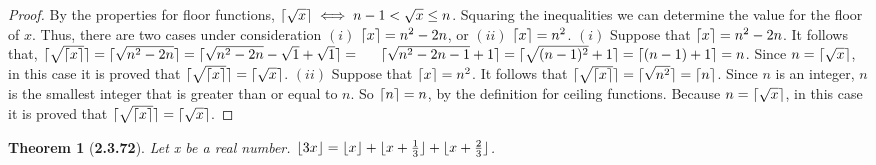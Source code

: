 \documentclass[a4paper, 12pt]{article}
\theoremstyle{plain}
\newtheorem*{theorem*}{Theorem}
\DeclarePairedDelimiter{\floor}{\lfloor}{\rfloor}
\DeclarePairedDelimiter{\ceil}{\lceil}{\rceil}
\begin{document}
\begin{proof}
    By the properties for floor functions, \newline $\ceil{\sqrt{x}} \iff n-1 < \sqrt{x} \le n$. 
    Squaring the inequalities we can determine the value for the floor of $x$. Thus, there are 
    two cases under consideration $(i)$ $\ceil{x} = n^{2} - 2n$, or $(ii)$ $\ceil{x} = n^{2}$.
    \newline
    \newline
    \indent $(i)$ Suppose that $\ceil{x} = n^{2} - 2n$. It follows that, \newline \indent 
    $\ceil{\sqrt{\ceil{x}}} = \ceil{\sqrt{n^{2} - 2n}} = 
    \ceil{\sqrt{n^{2} - 2n} - \sqrt{1} + \sqrt{1}} = \newline \indent 
    \ceil{\sqrt{n^{2} - 2n - 1} + 1} = \ceil{\sqrt{(n-1)^{2}} + 1} = \ceil{(n-1)+1} = n$. 
    Since \indent $n = \ceil{\sqrt{x}}$, in this case it is proved that 
    $\ceil{\sqrt{\ceil{x}}} = \ceil{\sqrt{x}}$.
    \newline
    \newline
    \indent
    $(ii)$ Suppose that $\ceil{x} = n^{2}$. It follows that 
    $\ceil{\sqrt{\ceil{x}}} = \ceil{\sqrt{n^{2}}} = \ceil{n}$. \indent Since $n$ is an integer, 
    $n$ is the smallest integer that is greater than or \indent equal to $n$. So $\ceil{n} = n$, 
    by the definition for ceiling functions. Because \indent $n = \ceil{\sqrt{x}}$, in this case 
    it is proved that $\ceil{\sqrt{\ceil{x}}} = \ceil{\sqrt{x}}$.
\end{proof}

\pagebreak


\begin{theorem*}[\textbf{2.3.72}]
    Let x be a real number. 
    $\floor{3x} = \floor{x} + \floor{x + \frac{1}{3}} + \floor{x + \frac{2}{3}}$.
\end{theorem*}
\end{document}

